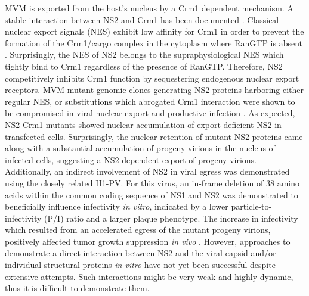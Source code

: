 MVM is exported from the host’s nucleus by a Crm1 dependent mechanism. A stable interaction between NS2 and Crm1 has been documented \cite{pmid10438867, pmid10527855}. Classical nuclear export signals (NES) exhibit low affinity for Crm1 in order to prevent the formation of the Crm1/cargo complex in the cytoplasm where RanGTP is absent \cite{pmid10449743}. Surprisingly, the NES of NS2 belongs to the supraphysiological NES which tightly bind to Crm1 regardless of the presence of RanGTP. Therefore, NS2 competitively inhibits Crm1 function by sequestering endogenous nuclear export receptors. MVM mutant genomic clones generating NS2 proteins harboring either regular NES, or substitutions which abrogated Crm1 interaction were shown to be compromised in viral nuclear export and productive infection \cite{pmid18385513}. As expected, NS2-Crm1-mutants showed nuclear accumulation of export deficient NS2 in transfected cells. Surprisingly, the nuclear retention of mutant NS2 proteins came along with a substantial accumulation of progeny virions in the nucleus of infected cells, suggesting a NS2-dependent export of progeny virions. Additionally, an indirect involvement of NS2 in viral egress was demonstrated using the closely related H1-PV. For this virus, an in-frame deletion of 38 amino acids within the common coding sequence of NS1 and NS2 was demonstrated to beneficially influence infectivity \textit{in vitro}, indicated by a lower particle-to-infectivity (P/I) ratio and a larger plaque phenotype. The increase in infectivity which resulted from an accelerated egress of the mutant progeny virions, positively affected tumor growth suppression \textit{in vivo} \cite{pmid22553326}. However, approaches to demonstrate a direct interaction between NS2 and the viral capsid and/or individual structural proteins \textit{in vitro} have not yet been successful despite extensive attempts. Such interactions might be very weak and highly dynamic, thus it is difficult to demonstrate them.  


